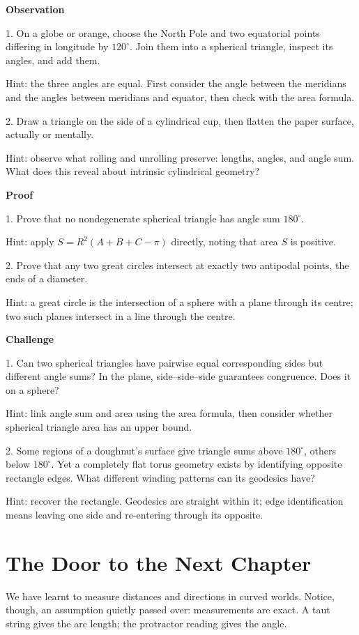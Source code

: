 \textbf{Observation}

1. On a globe or orange, choose the North Pole and two equatorial points differing in longitude by $120^\circ$. Join them into a spherical triangle, inspect its angles, and add them.

Hint: the three angles are equal. First consider the angle between the meridians and the angles between meridians and equator, then check with the area formula.

2. Draw a triangle on the side of a cylindrical cup, then flatten the paper surface, actually or mentally.

Hint: observe what rolling and unrolling preserve: lengths, angles, and angle sum. What does this reveal about intrinsic cylindrical geometry?

\textbf{Proof}

1. Prove that no nondegenerate spherical triangle has angle sum $180^\circ$.

Hint: apply $S=R^2(A+B+C-\pi)$ directly, noting that area $S$ is positive.

2. Prove that any two great circles intersect at exactly two antipodal points, the ends of a diameter.

Hint: a great circle is the intersection of a sphere with a plane through its centre; two such planes intersect in a line through the centre.

\textbf{Challenge}

1. Can two spherical triangles have pairwise equal corresponding sides but different angle sums? In the plane, side--side--side guarantees congruence. Does it on a sphere?

Hint: link angle sum and area using the area formula, then consider whether spherical triangle area has an upper bound.

2. Some regions of a doughnut's surface give triangle sums above $180^\circ$, others below $180^\circ$. Yet a completely flat torus geometry exists by identifying opposite rectangle edges. What different winding patterns can its geodesics have?

Hint: recover the rectangle. Geodesics are straight within it; edge identification means leaving one side and re-entering through its opposite.

\section*{The Door to the Next Chapter}

We have learnt to measure distances and directions in curved worlds. Notice, though, an assumption quietly passed over: measurements are exact. A taut string gives the arc length; the protractor reading gives the angle.

